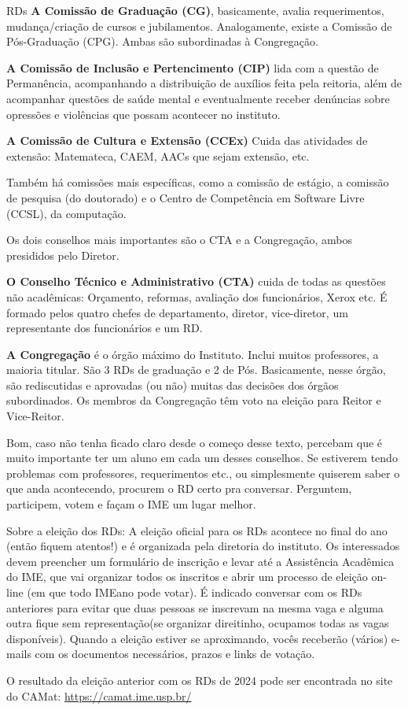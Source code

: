 \begin{subsecao}{RDs}
{\bf A Comissão de Graduação (CG)}, basicamente, avalia requerimentos,
mudança/criação de cursos e jubilamentos. Analogamente, existe a Comissão de
Pós-Graduação (CPG). Ambas são subordinadas à Congregação.

{\bf A Comissão de Inclusão e Pertencimento (CIP)} lida com a questão de Permanência,
acompanhando a distribuição de auxílios feita pela reitoria, além de acompanhar
questões de saúde mental e eventualmente receber denúncias sobre opressões e 
violências que possam acontecer no instituto.

{\bf A Comissão de Cultura e Extensão (CCEx)} Cuida das atividades de extensão: 
Matemateca, CAEM, AACs que sejam extensão, etc.

Também há comissões mais específicas, como a comissão de estágio, a comissão de
pesquisa (do doutorado) e o Centro de Competência em Software Livre (CCSL), da
computação.

Os dois conselhos mais importantes são o CTA e a Congregação, ambos presididos
pelo Diretor.

{\bf O Conselho Técnico e Administrativo (CTA)} cuida de todas as questões não
acadêmicas: Orçamento, reformas, avaliação dos funcionários, Xerox etc. É
formado pelos quatro chefes de departamento, diretor, vice-diretor, um
representante dos funcionários e um RD.

{\bf A Congregação} é o órgão máximo do Instituto. Inclui muitos professores, a
maioria titular. São 3 RDs de graduação e 2 de Pós. Basicamente,
nesse órgão, são rediscutidas e aprovadas (ou não) muitas das decisões
dos órgãos subordinados. Os membros da Congregação têm voto na eleição para
Reitor e Vice-Reitor.

Bom, caso não tenha ficado claro desde o começo desse texto, percebam que é
muito importante ter um aluno em cada um desses conselhos. Se estiverem tendo
problemas com professores, requerimentos etc., ou simplesmente quiserem saber
o que anda acontecendo, procurem o RD certo pra conversar. Perguntem,
participem, votem e façam o IME um lugar melhor.

Sobre a eleição dos RDs: A eleição oficial para os RDs acontece no final do ano
(então fiquem atentos!) e é organizada pela diretoria do instituto. Os
interessados devem preencher um formulário de inscrição e levar até a
Assistência Acadêmica do IME, que vai organizar todos os inscritos e abrir um
processo de eleição on-line (em que todo IMEano pode votar). É indicado conversar
com os RDs anteriores para evitar que duas pessoas se inscrevam na mesma vaga e
alguma outra fique sem representação(se organizar direitinho, ocupamos todas as vagas
disponíveis). Quando a eleição
estiver se aproximando, vocês receberão (vários) e-mails com os documentos
necessários, prazos e links de votação.

O resultado da eleição anterior com os RDs de 2024 pode ser encontrada no site
do CAMat:
\url{https://camat.ime.usp.br/}


\end{subsecao}
